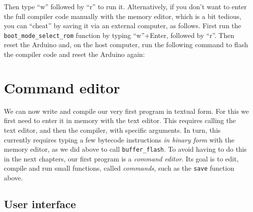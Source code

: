 
Then type ``w'' followed by ``r'' to run it.
Alternatively, if you don't want to enter the full compiler code manually with
the memory editor, which is a bit tedious, you can ``cheat'' by saving it via
an external computer, as follows. First run the \verb!boot_mode_select_rom!
function by typing ``w''+Enter, followed by
``r''. Then reset the Arduino and, on the host computer, run the following
command to flash the compiler code and reset the Arduino again:


\section{Command editor}

We can now write and compile our very first program in textual form. For this
we first need to enter it in memory with the text editor. This requires calling
the text editor, and then the compiler, with specific arguments. In turn, this
currently requires typing a few bytecode instructions {\em in binary form} with
the memory editor, as we did above to call {\tt buffer\_flash}. To avoid having
to do this in the next chapters, our first program is a {\em command editor}.
Its goal is to edit, compile and run small functions, called {\em commands},
such as the {\tt save} function above.

\subsection{User interface}

